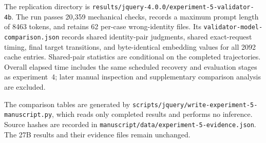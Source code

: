 The replication directory is \nolinkurl{results/jquery-4.0.0/experiment-5-validator-4b}. The run passes 20,359 mechanical checks, records a maximum prompt length of 8463 tokens, and retains 62 per-case wrong-identity files. Its \nolinkurl{validator-model-comparison.json} records shared identity-pair judgments, shared exact-request timing, final target transitions, and byte-identical embedding values for all 2092 cache entries. Shared-pair statistics are conditional on the completed trajectories. Overall elapsed time includes the same scheduled recovery and evaluation stages as experiment~4; later manual inspection and supplementary comparison analysis are excluded.

The comparison tables are generated by \nolinkurl{scripts/jquery/write-experiment-5-manuscript.py}, which reads only completed results and performs no inference. Source hashes are recorded in \nolinkurl{manuscript/data/experiment-5-evidence.json}. The 27B results and their evidence files remain unchanged.
